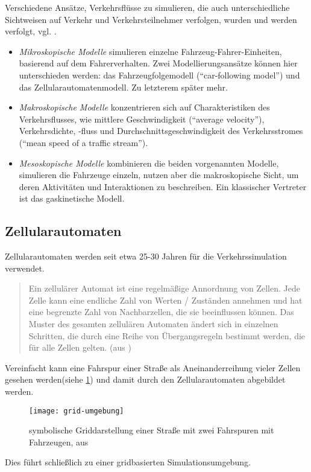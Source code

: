 Verschiedene Ansätze, Verkehrsflüsse zu simulieren, die auch unterschiedliche Sichtweisen auf Verkehr und Verkehrsteilnehmer verfolgen, %
wurden und werden verfolgt, vgl. \cite{dingding}.
\begin{itemize}
	\item \textit{Mikroskopische Modelle} simulieren einzelne Fahrzeug-Fahrer-Einheiten, basierend auf dem Fahrerverhalten. Zwei Modellierungsansätze können hier unterschieden werden: das Fahrzeugfolgemodell (\enquote{car-following model}) und das Zellularautomatenmodell. Zu letzterem später mehr.
	\item \textit{Makroskopische Modelle}  konzentrieren sich auf Charakteristiken des Verkehrsflusses, wie mittlere Geschwindigkeit (\enquote{average velocity}), Verkehrsdichte, -fluss und Durchschnittsgeschwindigkeit des Verkehrsstromes (\enquote{mean speed of a traffic stream}).
	\item \textit{Mesoskopische Modelle} kombinieren die beiden vorgenannten Modelle, simulieren die Fahrzeuge einzeln, nutzen aber die makroskopische Sicht, um deren Aktivitäten und Interaktionen zu beschreiben. Ein klassischer Vertreter ist das gaskinetische Modell.
\end{itemize}



\subsection{Zellularautomaten}
\label{sec:ca}

Zellularautomaten werden seit etwa 25-30 Jahren für die Verkehrssimulation verwendet.

\begin{quote}
Ein zellulärer Automat ist eine regelmäßige Annordnung von Zellen. Jede Zelle kann eine endliche Zahl von Werten / Zuständen annehmen und hat eine  begrenzte Zahl von Nachbarzellen, die sie beeinflussen können. Das Muster des gesamten zellulären Automaten ändert sich in einzelnen Schritten, die durch eine Reihe von Übergangsregeln bestimmt werden, die für alle Zellen gelten. (aus \cite{cell-autom})
\end{quote} 

\noindent
Vereinfacht kann eine Fahrspur einer Straße als Aneinanderreihung vieler Zellen gesehen werden(siehe \cref{figure:grid-umgebung}) und damit durch den Zellularautomaten abgebildet werden. 
\begin{figure}[hptb]
 \centering
 \texttt{[image: grid-umgebung]}
 \caption[Beispiel für eine Griddarstellung einer Straße]
 		{symbolische Griddarstellung einer Straße mit zwei Fahrspuren mit Fahrzeugen, aus \cite{multi-lane}}
 \label{figure:grid-umgebung}
\end{figure} 
Dies führt schließlich zu einer gridbasierten Simulationsumgebung. 


